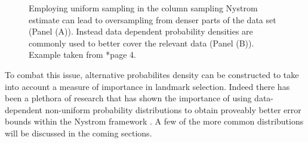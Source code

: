 \begin{figure}[h]
{\begin{adjustbox}{width=0.4\textwidth}
        \end{adjustbox}
    }
    \caption{Employing uniform sampling in the column sampling Nystrom estimate can lead to oversampling from denser parts of the data set (Panel (A)). Instead data dependent probability densities are commonly used to better cover the relevant data (Panel (B)). Example taken from \cite{musco2017recursive}*{page 4}.}
    \label{fig: uni-samp-v-nonuni-samp}
\end{figure}
To combat this issue, alternative probabilites density can be constructed to take into account a measure of importance in landmark selection. Indeed there has been a plethora of research that has shown the importance of using data-dependent non-uniform probability distributions to obtain proveably better error bounds within the Nystrom framework \cite{JMLR:v6:drineas05a,DBLP:journals/corr/abs-1303-1849,musco2017recursive,DBLP:journals/corr/abs-1109-3843,DBLP:journals/corr/CohenMM15,kumar2009sampling}. A few of the more common distributions will be discussed in the coming sections.